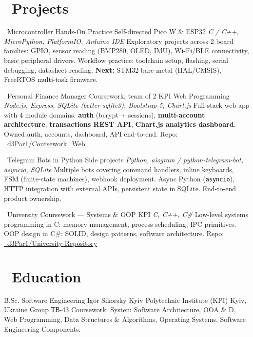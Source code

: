 \documentclass[10pt,a4paper,sans]{moderncv}
\begin{document}
\section{\faFolderOpen\ Projects}

        {\faMicrochip\ Microcontroller Hands-On Practice}
        {Self-directed}
        {Pico W \& ESP32}
        {\textit{C / C++, MicroPython, PlatformIO, Arduino IDE}}
        {\small Exploratory projects across 2 board families: GPIO, sensor reading (BMP280, OLED, IMU), Wi-Fi/BLE connectivity, basic peripheral drivers. Workflow practice: toolchain setup, flashing, serial debugging, datasheet reading. \textbf{Next:} STM32 bare-metal (HAL/CMSIS), FreeRTOS multi-task firmware.}

        {\faChartLine\ Personal Finance Manager}
        {Coursework, team of 2}
        {KPI Web Programming}
        {\textit{Node.js, Express, SQLite (better-sqlite3), Bootstrap 5, Chart.js}}
        {\small Full-stack web app with 4 module domains: \textbf{auth} (bcrypt + sessions), \textbf{multi-account architecture}, \textbf{transactions REST API}, \textbf{Chart.js analytics dashboard}. Owned auth, accounts, dashboard, API end-to-end. Repo: \href{https://github.com/d3Par1/Coursework_Web}{\faGithub\ d3Par1/Coursework\_Web}}

        {\faRobot\ Telegram Bots in Python}
        {Side projects}
        {}
        {\textit{Python, aiogram / python-telegram-bot, asyncio, SQLite}}
        {\small Multiple bots covering command handlers, inline keyboards, FSM (finite-state machines), webhook deployment. Async Python (\texttt{asyncio}), HTTP integration with external APIs, persistent state in SQLite. End-to-end product ownership.}

        {\faGraduationCap\ University Coursework — Systems \& OOP}
        {KPI}
        {}
        {\textit{C, C++, C\#}}
        {\small Low-level systems programming in C: memory management, process scheduling, IPC primitives. OOP design in C\#: SOLID, design patterns, software architecture. Repo: \href{https://github.com/d3Par1/University-Repository}{\faGithub\ d3Par1/University-Repository}}

\section{\faUniversity\ Education}
        {B.Sc. Software Engineering}
        {Igor Sikorsky Kyiv Polytechnic Institute (KPI)}
        {Kyiv, Ukraine}
        {Group \foreignlanguage{ukrainian}{ТВ}-43}
        {\small Coursework: System Software Architecture, OOA \& D, Web Programming, Data Structures \& Algorithms, Operating Systems, Software Engineering Components.}
\end{document}
